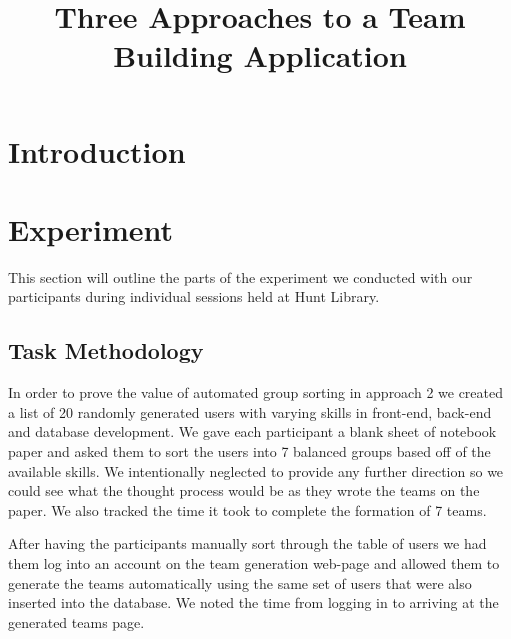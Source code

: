 \documentclass[conference]{IEEEtran}
\begin{document}
\title{Three Approaches to a Team Building Application}

\author{
}


\maketitle

\section{Introduction}
\blindtext

\section{Experiment}
This section will outline the parts of the experiment we conducted with our participants during individual sessions held at Hunt Library.

\subsection{Task Methodology}
In order to prove the value of automated group sorting in approach 2 we created a list of 20 randomly generated users with varying skills in front-end, back-end and database development. We gave each participant a blank sheet of notebook paper and asked them to sort the users into 7 balanced groups based off of the available skills. We intentionally neglected to provide any further direction so we could see what the thought process would be as they wrote the teams on the paper. We also tracked the time it took to complete the formation of 7 teams. 

After having the participants manually sort through the table of users we had them log into an account on the team generation web-page and allowed them to generate the teams automatically using the same set of users that were also inserted into the database. We noted the time from logging in to arriving at the generated teams page.
\end{document}
